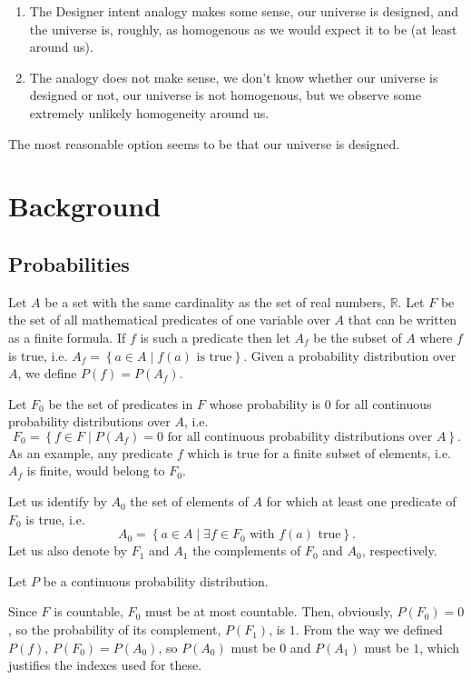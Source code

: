 \documentclass[a4paper
,draft
]{article}
\def\reale{\mathbb{R}}
\newcommand{\multime}[1]{\left\{ #1 \right\}}
\begin{document}
\begin{enumerate}
\item The Designer intent analogy makes some sense, our universe is designed,
      and the universe is, roughly, as homogenous as we would
      expect it to be (at least around us).
\item The analogy does not make sense, we don't know whether our universe is
      designed or not, our universe is not homogenous, but we observe some
      extremely unlikely homogeneity around us.
\end{enumerate}

The most reasonable option seems to be that our universe is designed.

\section{Background}
\label{sec:background}
\subsection{Probabilities}
\label{sec:probabilities}

Let $A$ be a set with the same cardinality as the set of real numbers, $\reale$.
Let $F$ be the set of
all mathematical predicates of one variable over $A$ that can be written as a
finite formula.
If $f$ is such a predicate then let $A_f$ be the subset of
$A$ where $f$ is true, i.e. $A_f=\multime{a\in A\mid f(a) \mbox{ is true}}$.
Given a probability distribution over $A$, we define $P(f)=P(A_f)$.

Let $F_0$ be the set of predicates in $F$ whose probability is
$0$ for all continuous probability distributions over $A$, i.e.
$$F_0=\multime{
  f\in F
  \mid P(A_f)=0
    \mbox{ for all continuous probability distributions over } A}.
$$
As an example, any predicate $f$ which is true for a finite subset of elements,
i.e. $A_f$ is finite, would belong to $F_0$.

Let us identify by $A_0$ the
set of elements of $A$ for which at least one predicate of $F_0$ is true, i.e.
$$A_0=\multime{a \in A\mid \exists f\in F_0 \mbox{ with } f(a)\mbox{ true} }.$$
Let us also denote by $F_1$ and $A_1$ the complements of $F_0$ and $A_0$,
respectively.

Let $P$ be a continuous probability distribution.

Since $F$ is countable, $F_0$ must be at most countable. Then,
obviously, $P(F_0)=0$, so the probability of its complement, $P(F_1)$, is $1$.
From the way we defined $P(f)$, $P(F_0) = P(A_0)$, so $P(A_0)$ must be $0$
and $P(A_1)$ must be $1$, which justifies the indexes used for
these.
\end{document}
